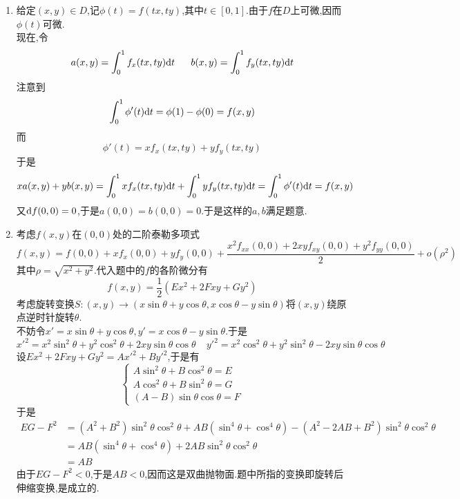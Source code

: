 \documentclass{ctexart}
\begin{document}
\begin{solution}
    \begin{enumerate}[label=\textbf{(\arabic*)},leftmargin=*]
        \item 给定$(x,y)\in D$,记$\phi(t)=f(tx,ty)$,其中$t\in[0,1]$.由于$f$在$D$上可微,因而$\phi(t)$可微.\\
            现在,令
            \[a(x,y)=\int_{0}^{1}f_x(tx,ty)\di t\ \ \ \ \ b(x,y)=\int_{0}^{1}f_y(tx,ty)\di t\]
            注意到
            \[\int_0^1\phi'(t)\mathrm{d} t=\phi(1)-\phi(0)=f(x,y)\]
            而
            \[\phi'(t)=xf_x(tx,ty)+yf_y(tx,ty)\]
            于是
            \[xa(x,y)+yb(x,y)=\int_0^1 xf_x(tx,ty)\mathrm{d} t+\int_0^1 yf_y(tx,ty)\mathrm{d} t=\int_0^1\phi'(t)\mathrm{d} t=f(x,y)\]
            又$\mathrm{d} f(0,0)=0$,于是$a(0,0)=b(0,0)=0$.于是这样的$a,b$满足题意.
        \item 考虑$f(x,y)$在$(0,0)$处的二阶泰勒多项式
            \[f(x,y)=f(0,0)+xf_x(0,0)+yf_y(0,0)+\dfrac{x^2f_{xx}(0,0)+2xyf_{xy}(0,0)+y^2f_{yy}(0,0)}{2}+o(\rho^2)\]
            其中$\rho=\sqrt{x^2+y^2}$.代入题中的$f$的各阶微分有
            \[f(x,y)=\dfrac{1}{2}\left(Ex^2+2Fxy+Gy^2\right)\]
            考虑旋转变换$S:(x,y)\to(x\sin\theta+y\cos\theta,x\cos\theta-y\sin\theta)$将$(x,y)$绕原点逆时针旋转$\theta$.\\
            不妨令$x'=x\sin\theta+y\cos\theta,y'=x\cos\theta-y\sin\theta$.于是
            \[x'^2=x^2\sin^2\theta+y^2\cos^2\theta+2xy\sin\theta\cos\theta\ \ \ \ \ y'^2=x^2\cos^2\theta+y^2\sin^2\theta-2xy\sin\theta\cos\theta\]
            设$Ex^2+2Fxy+Gy^2=Ax'^2+By'^2$,于是有
            \[\left\{\begin{array}{l}
                A\sin^2\theta+B\cos^2\theta=E\\
                A\cos^2\theta+B\sin^2\theta=G\\
                (A-B)\sin\theta\cos\theta=F
            \end{array}\right.\]
            于是
            \[\begin{aligned}
                EG-F^2
                &= (A^2+B^2)\sin^2\theta\cos^2\theta+AB(\sin^4\theta+\cos^4\theta)-(A^2-2AB+B^2)\sin^2\theta\cos^2\theta \\
                &= AB(\sin^4\theta+\cos^4\theta)+2AB\sin^2\theta\cos^2\theta \\
                &= AB
            \end{aligned}\]
            由于$EG-F^2<0$,于是$AB<0$,因而这是双曲抛物面.题中所指的变换即旋转后伸缩变换,是成立的.
    \end{enumerate}
\end{solution}
\end{document}
